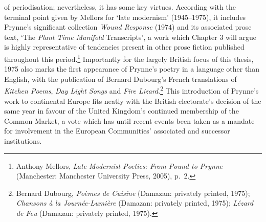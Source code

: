 \documentclass[]{article}
\begin{document}
of periodisation; nevertheless, it has some key virtues. According with
the terminal point given by Mellors for ‘late modernism’ (1945–1975), it
includes Prynne’s significant collection \emph{Wound Response} (1974)
and its associated prose text, ‘The \emph{Plant Time Manifold}
Transcripts’, a work which Chapter 3 will argue is highly representative
of tendencies present in other prose fiction published throughout this
period.\footnote{Anthony Mellors, \emph{Late Modernist Poetics: From
  Pound to Prynne} (Manchester: Manchester University Press, 2005),
  p.~2.} Importantly for the largely British focus of this thesis, 1975
also marks the first appearance of Prynne’s poetry in a language other
than English, with the publication of Bernard Dubourg’s French
translations of \emph{Kitchen Poems}, \emph{Day Light Songs} and
\emph{Fire Lizard}.\footnote{Bernard Dubourg, \emph{Poèmes de Cuisine}
  (Damazan: privately printed, 1975); \emph{Chansons à la
  Journée-Lumière} (Damazan: privately printed, 1975); \emph{Lézard de
  Feu} (Damazan: privately printed, 1975).} This introduction of
Prynne’s work to continental Europe fits neatly with the British
electorate’s decision of the same year in favour of the United Kingdom’s
continued membership of the Common Market, a vote which has until recent
events been taken as a mandate for involvement in the European
Communities’ associated and successor institutions.
\end{document}
